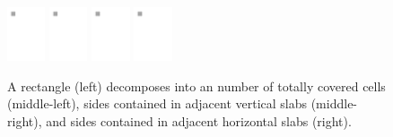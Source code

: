 \documentclass[letterpaper,12pt,twocolumn]{article}
\theoremstyle{plain}
\begin{document}
\begin{figure}[t!]
  \centering
    \includegraphics[width=0.10\textwidth,page=1]{figures/grid-decomposition}
    \includegraphics[width=0.10\textwidth,page=2]{figures/grid-decomposition}
    \includegraphics[width=0.10\textwidth,page=4]{figures/grid-decomposition}
    \includegraphics[width=0.10\textwidth,page=3]{figures/grid-decomposition}
  \caption[Grid decomposition]{A rectangle (left) decomposes into an
    number of totally covered cells (middle-left), sides contained in
    adjacent vertical slabs (middle-right), and sides contained in
    adjacent horizontal slabs (right).}\label{fig:grid:decomposition}
\end{figure}



\end{document}
